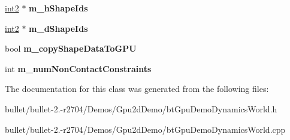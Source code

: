 \begin{DoxyCompactItemize}
\item 
\hypertarget{classbt_gpu_demo_dynamics_world_a9ac9d4d5d66b067aa32e47b926330db9}{\hyperlink{structint2}{int2} $\ast$ {\bfseries m\+\_\+h\+Shape\+Ids}}\label{classbt_gpu_demo_dynamics_world_a9ac9d4d5d66b067aa32e47b926330db9}

\item 
\hypertarget{classbt_gpu_demo_dynamics_world_ab3e33ff151522cad75f621cae2dc69cc}{\hyperlink{structint2}{int2} $\ast$ {\bfseries m\+\_\+d\+Shape\+Ids}}\label{classbt_gpu_demo_dynamics_world_ab3e33ff151522cad75f621cae2dc69cc}

\item 
\hypertarget{classbt_gpu_demo_dynamics_world_ad4c42aa85bf4977700bb2b22fbdf80a5}{bool {\bfseries m\+\_\+copy\+Shape\+Data\+To\+G\+P\+U}}\label{classbt_gpu_demo_dynamics_world_ad4c42aa85bf4977700bb2b22fbdf80a5}

\item 
\hypertarget{classbt_gpu_demo_dynamics_world_a4a3da8d1e99da1afeedd6301868484d7}{int {\bfseries m\+\_\+num\+Non\+Contact\+Constraints}}\label{classbt_gpu_demo_dynamics_world_a4a3da8d1e99da1afeedd6301868484d7}

\end{DoxyCompactItemize}


The documentation for this class was generated from the following files\+:\begin{DoxyCompactItemize}
\item 
bullet/bullet-\/2.-\/r2704/\+Demos/\+Gpu2d\+Demo/bt\+Gpu\+Demo\+Dynamics\+World.\+h\item 
bullet/bullet-\/2.-\/r2704/\+Demos/\+Gpu2d\+Demo/bt\+Gpu\+Demo\+Dynamics\+World.\+cpp\end{DoxyCompactItemize}
